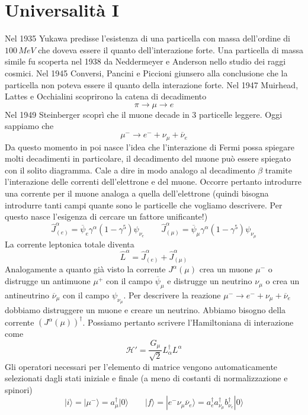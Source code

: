 \section{Universalità I}
Nel 1935 Yukawa predisse l'esistenza di una particella con massa dell'ordine di $100\,\unit{MeV}$ che doveva essere il quanto dell'interazione forte. Una particella di massa simile fu scoperta nel 1938 da Neddermeyer e Anderson nello studio dei raggi cosmici. Nel 1945 Conversi, Pancini e Piccioni giunsero alla conclusione che la particella non poteva essere il quanto della interazione forte. Nel 1947 Muirhead, Lattes e Occhialini scoprirono la catena di decadimento
$$
\pi\to\mu\to e
$$
Nel 1949 Steinberger scoprì che il muone decade in $3$ particelle leggere. Oggi sappiamo che
$$
\mu^-\to e^-+\nu_\mu+\overline{\nu}_e
$$
Da questo momento in poi nasce l'idea che l'interazione di Fermi possa spiegare molti decadimenti in particolare, il decadimento del muone può essere spiegato con il solito diagramma. Cale a dire in modo analogo al decadimento $\beta$ tramite l'interazione delle correnti dell'elettrone e del muone. Occorre pertanto introdurre una corrente per il muone analoga a quella dell'elettrone (quindi bisogna introdurre tanti campi quante sono le particelle che vogliamo descrivere. Per questo nasce l'esigenza di cercare un fattore unificante!)
$$
\hat{J}^\alpha_{(e)} = \overline{\psi}_e \gamma^\alpha (1 - \gamma^5) \psi_{\nu_e} \qquad \hat{J}^\alpha_{(\mu)} = \overline{\psi}_\mu \gamma^\alpha (1 - \gamma^5) \psi_{\nu_\mu}
$$
La corrente leptonica totale diventa
$$
\widehat{L}^\alpha = \widehat{J}^\alpha_{(e)} + \widehat{J}^\alpha_{(\mu)}
$$
Analogamente a quanto già visto la corrente $J^\alpha(\mu)$ crea un muone $\mu^-$ o distrugge un antimuone $\mu^+$ con il campo $\overline{\psi}_\mu$ e distrugge un neutrino $\nu_\mu$ o crea un antineutrino $\overline{\nu}_\mu$ con il campo $\psi_{\nu_\mu}$. Per descrivere la reazione $\mu^-\to e^-+\nu_\mu+\overline{\nu}_e$ dobbiamo distruggere un muone e creare un neutrino. Abbiamo bisogno della corrente $(J^\alpha(\mu))^\dagger$. Possiamo pertanto scrivere l'Hamiltoniana di interazione come
$$
\mathcal{H}' = \frac{G_\mu}{\sqrt{2}} L_\alpha^\dagger L^\alpha
$$
Gli operatori necessari per l'elemento di matrice vengono automaticamente selezionati dagli stati iniziale e finale (a meno di costanti di normalizzazione e spinori)
$$
|i\rangle = |\mu^-\rangle = a_\mu^\dagger |0\rangle \qquad |f\rangle = |e^- \nu_\mu \overline{\nu}_e\rangle = a_e^\dagger a_{\nu_\mu}^\dagger b_{\nu_e}^\dagger |0\rangle
$$
